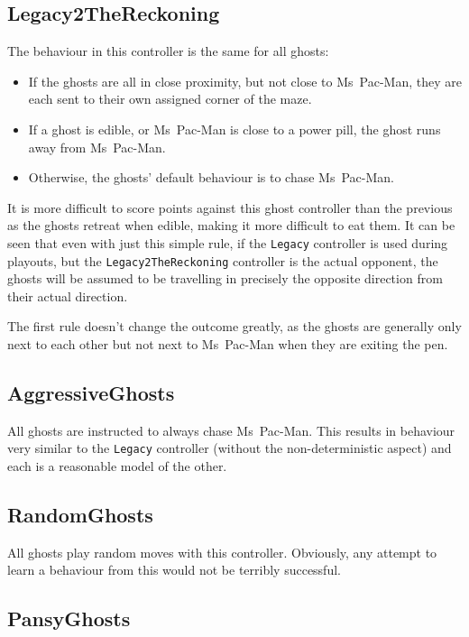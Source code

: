 \subsection{Legacy2TheReckoning}

The behaviour in this controller is the same for all ghosts:

\begin{itemize}
\item If the ghosts are all in close proximity, but not close to Ms~Pac-Man, they are each sent to their own assigned corner of the maze.
\item If a ghost is edible, or Ms~Pac-Man is close to a power pill, the ghost runs away from Ms~Pac-Man.
\item Otherwise, the ghosts' default behaviour is to chase Ms~Pac-Man.
\end{itemize}

It is more difficult to score points against this ghost controller than the previous as the ghosts retreat when edible, making it more difficult to eat them.  It can be seen that even with just this simple rule, if the {\tt Legacy} controller is used during playouts, but the {\tt Legacy2TheReckoning} controller is the actual opponent, the ghosts will be assumed to be travelling in precisely the opposite direction from their actual direction.

The first rule doesn't change the outcome greatly, as the ghosts are generally only next to each other but not next to Ms~Pac-Man when they are exiting the pen.

\subsection{AggressiveGhosts}

All ghosts are instructed to always chase Ms~Pac-Man.  This results in behaviour very similar to the {\tt Legacy} controller (without the non-deterministic aspect) and each is a reasonable model of the other.

\subsection{RandomGhosts}

All ghosts play random moves with this controller.  Obviously, any attempt to learn a behaviour from this would not be terribly successful.

\subsection{PansyGhosts}

